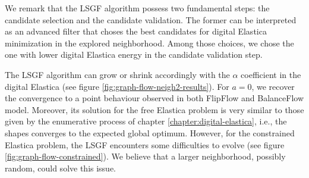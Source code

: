 We remark that the LSGF algorithm possess two fundamental steps: the candidate selection and the candidate validation. The former can be interpreted as an advanced filter that choses the best candidates for digital Elastica minimization in the explored neighborhood. Among those choices, we chose the one with lower digital Elastica energy in the candidate validation step.

The LSGF algorithm can grow or shrink accordingly with the $\alpha$ coefficient in the digital Elastica (see figure \ref{fig:graph-flow-neigh2-results}). For $a=0$, we recover the convergence to a point behaviour observed in both FlipFlow and BalanceFlow model. Moreover, its solution for the free Elastica problem is very similar to those given by the enumerative process of chapter \ref{chapter:digital-elastica}, i.e., the shapes converges to the expected global optimum. However, for the constrained Elastica problem, the LSGF encounters some difficulties to evolve (see figure \ref{fig:graph-flow-constrained}). We believe that a larger neighborhood, possibly random, could solve this issue.

